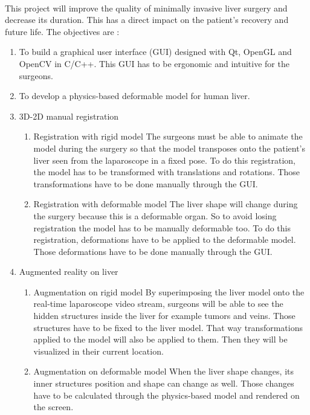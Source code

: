 \documentclass[12pt]{report}
\begin{document}
\paragraph{}
	This project will improve the quality of minimally invasive liver surgery and decrease its duration. This has a direct impact on the patient's recovery and future life. The objectives are :
\begin{enumerate}
\item To build a graphical user interface (GUI) designed with Qt, OpenGL and OpenCV in C/C++. This GUI has to be ergonomic and intuitive for the surgeons.
\item To develop a physics-based deformable model for human liver.

\item 3D-2D manual registration
\begin{enumerate}
\item Registration with rigid model
The surgeons must be able to animate the model during the surgery so that the model transposes onto the patient's liver seen from the laparoscope in a fixed pose. To do this registration, the model has to be transformed with translations and rotations. Those transformations have to be done manually through the GUI.

\item Registration with deformable model
The liver shape will change during the surgery because this is a deformable organ. So to avoid losing registration the model has to be manually deformable too. To do this registration, deformations have to be applied to the deformable model. Those deformations have to be done manually through the GUI.
\end{enumerate}

\item Augmented reality on liver
\begin{enumerate}
\item Augmentation on rigid model
By superimposing the liver model onto the real-time laparoscope video stream, surgeons will be able to see the hidden structures inside the liver for example tumors and veins. Those structures have to be fixed to the liver model. That way transformations applied to the model will also be applied to them. Then they will be visualized in their current location.

\item Augmentation on deformable model
When the liver shape changes, its inner structures position and shape can change as well. Those changes have to be calculated through the physics-based model and rendered on the screen.
\end{enumerate}
\end{enumerate}
\end{document}
